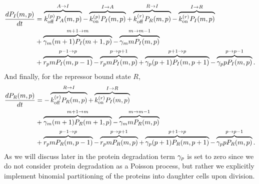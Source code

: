 \begin{equation}
  \begin{aligned}
    \dt{P_I(m, p)} &=
    \overbrace{\kpoff P_A(m, p)}^{A \rightarrow I} %
    - \overbrace{\kpon P_I(m, p)}^{I \rightarrow A} %
    + \overbrace{\kroff P_R(m, p)}^{R \rightarrow I} %
    - \overbrace{\kron P_I(m, p)}^{I \rightarrow R}\\ %
    &+ \overbrace{\gm (m + 1) P_I(m+1 , p)}^{m+1 \rightarrow m} %
    - \overbrace{\gm m P_I(m , p)}^{m \rightarrow m-1}\\ %
    &+ \overbrace{r_p m P_I(m, p - 1)}^{p-1 \rightarrow p} %
    - \overbrace{r_p m P_I(m, p)}^{p \rightarrow p+1} %
    + \overbrace{\gp (p + 1) P_I(m, p + 1)}^{p + 1 \rightarrow p} %
    - \overbrace{\gp p P_I(m, p)}^{p \rightarrow p-1}. %
  \end{aligned}
\end{equation}
And finally, for the repressor bound state $R$,
\begin{equation}
  \begin{aligned}
    \dt{P_R(m, p)} &=
    - \overbrace{\kroff P_R(m, p)}^{R \rightarrow I} %
    + \overbrace{\kron P_I(m, p)}^{I \rightarrow R}\\ %
    &+ \overbrace{\gm (m + 1) P_R(m+1 , p)}^{m+1 \rightarrow m} %
    - \overbrace{\gm m P_R(m , p)}^{m \rightarrow m-1}\\ %
    &+ \overbrace{r_p m P_R(m, p - 1)}^{p-1 \rightarrow p} %
    - \overbrace{r_p m P_R(m, p)}^{p \rightarrow p+1} %
    + \overbrace{\gp (p + 1) P_R(m, p + 1)}^{p + 1 \rightarrow p} %
    - \overbrace{\gp p P_R(m, p)}^{p \rightarrow p-1}. %
  \end{aligned}
\end{equation}
As we will discuss later in  the protein degradation
term $\gamma _p$ is set to zero since we do not consider protein degradation as a
Poisson process, but rather we explicitly implement binomial partitioning of
the proteins into daughter cells upon division.

